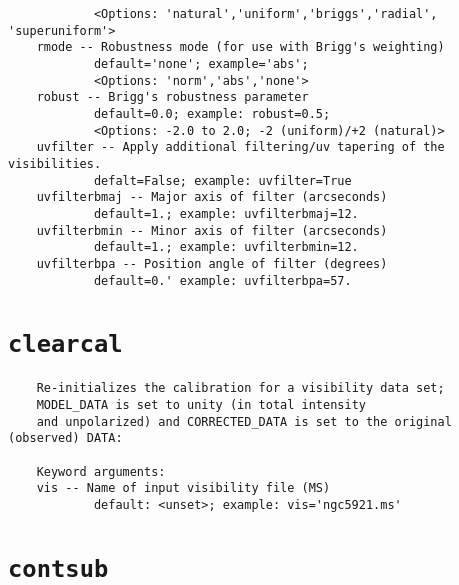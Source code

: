 \begin{verbatim}
            <Options: 'natural','uniform','briggs','radial', 'superuniform'>
    rmode -- Robustness mode (for use with Brigg's weighting)
            default='none'; example='abs'; 
            <Options: 'norm','abs','none'>
    robust -- Brigg's robustness parameter 
            default=0.0; example: robust=0.5; 
            <Options: -2.0 to 2.0; -2 (uniform)/+2 (natural)>
    uvfilter -- Apply additional filtering/uv tapering of the visibilities.
            defalt=False; example: uvfilter=True
    uvfilterbmaj -- Major axis of filter (arcseconds)
            default=1.; example: uvfilterbmaj=12.
    uvfilterbmin -- Minor axis of filter (arcseconds)
            default=1.; example: uvfilterbmin=12.
    uvfilterbpa -- Position angle of filter (degrees)
            default=0.' example: uvfilterbpa=57.
\end{verbatim}
\normalsize


\section{{\tt clearcal}}
\label{section:tasks.clearcal}

\small
\begin{verbatim}
    Re-initializes the calibration for a visibility data set;
    MODEL_DATA is set to unity (in total intensity 
    and unpolarized) and CORRECTED_DATA is set to the original (observed) DATA:
    
    Keyword arguments:
    vis -- Name of input visibility file (MS)
            default: <unset>; example: vis='ngc5921.ms'

\end{verbatim}
\normalsize


\section{{\tt contsub}}
\label{section:tasks.contsub}


